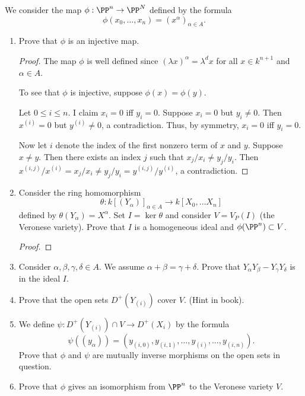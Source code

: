 \documentclass{article}
\begin{document}
We consider the map $\phi : \PP^n \to \PP^N$ defined by the formula
$$\phi(x_0, \ldots, x_n) = (x^\alpha)_{\alpha \in A}.$$
\begin{enumerate}[1)]
\item Prove that $\phi$ is an injective map.
\begin{proof}
The map $\phi$ is well defined since $(\lambda x)^\alpha = \lambda^d x$ for all $x \in k^{n +1}$ and $\alpha \in A$.

To see that $\phi$ is injective, suppose $\phi(x) = \phi(y)$.

Let $0 \le i \le n$.  I claim $x_i = 0$ iff $y_i = 0$. Suppose $x_i = 0$ but $y_i \neq 0$.  Then $x^{(i)} = 0$ but $y^{(i)} \neq 0$, a contradiction. Thus, by symmetry, $x_i = 0$ iff $y_i = 0$.

Now let $i$ denote the index of the first nonzero term of $x$ and $y$. Suppose $x \neq y$.  Then there exists an index $j$ such that $x_j/x_i \neq y_j/y_i$.
Then $x^{(i,j)}/x^{(i)} = x_j/x_i \neq y_j/y_i = y^{(i,j)}/y^{(i)}$, a contradiction.
\end{proof}

\item Consider the ring homomorphism
$$\theta : k[(Y_\alpha)]_{\alpha \in A} \to k[X_0, \ldots X_n]$$
defined by $\theta(Y_\alpha) = X^\alpha$. Set $I = \ker \theta$ and consider $V = V_P(I)$ (the Veronese variety).
Prove that $I$ is a homogeneous ideal and $\phi(\PP^n) \subset V$.
\begin{proof}

\end{proof}

\item Consider $\alpha, \beta, \gamma, \delta \in A$. We assume $\alpha + \beta = \gamma + \delta$. Prove that $Y_\alpha Y_\beta - Y_\gamma Y_\delta$ is in the ideal $I$.
\item Prove that the open sets $D^+(Y_{(i)})$ cover $V$. (Hint in book).
\item We define $\psi : D^+(Y_{(i)}) \cap V \to D^+(X_i)$ by the formula
$$\psi((y_\alpha)) = (y_{(i,0)}, y_{(i,1)}, \ldots, y_{(i)}, \ldots, y_{(i,n)}).$$
Prove that $\phi$ and $\psi$ are mutually inverse morphisms on the open sets in question.
\item Prove that $\phi$ gives an isomorphism from $\PP^n$ to the Veronese variety $V$.
\end{enumerate}
\end{document}
